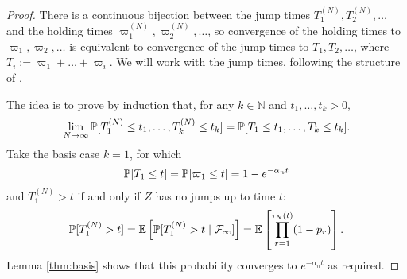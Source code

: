 \begin{proof}
There is a continuous bijection between the jump times $T_1^{(N)} ,T_2^{(N)},\dots$ and the holding times $\varpi_1^{(N)}, \varpi_2^{(N)}, \dots$, so convergence of the holding times to $\varpi_1, \varpi_2,\dots$ is equivalent to convergence of the jump times to $T_1, T_2, \dots$, where $T_i := \varpi_1+\dots+\varpi_i$. 
We will work with the jump times, following the structure of \textcite[Lemma 3.2]{mohle1999}.

The idea is to prove by induction that, for any $k\in\mathbb{N}$ and $t_1,\dots,t_k >0$,
\begin{equation}\label{eq:518}
\lim_{N\to\infty} \mathbb{P}[ T_1^{(N)} \leq t_1, \dots , T_k^{(N)} \leq t_k ]
= \mathbb{P}[ T_1 \leq t_1, \dots , T_k \leq t_k ] .
\end{equation}
Take the basis case $k=1$, for which
\begin{equation*}
\mathbb{P}[ T_1 \leq t ] 
= \mathbb{P}[ \varpi_1 \leq t ] = 1 - e^{-\alpha_n t}
\end{equation*}
and $T_1^{(N)} >t$ if and only if $Z$ has no jumps up to time $t$:
\begin{equation*}
\mathbb{P}[T_1^{(N)} >t]
= \mathbb{E}\left[ \mathbb{P}[ T_1^{(N)} >t \mid \mathcal{F}_\infty ] \right]
= \mathbb{E}\left[ \prod_{r=1}^{\tau_N(t)} (1-p_r) \right] .
\end{equation*}
Lemma \ref{thm:basis} shows that this probability converges to $e^{-\alpha_n t}$ as required.


\end{proof}
